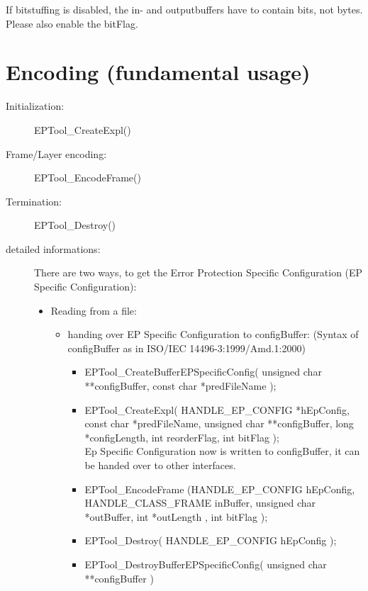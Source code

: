 \documentclass[a4paper]{article}
\begin{document}
If bitstuffing is disabled, the in- and outputbuffers have to contain
bits, not bytes. Please also enable the bitFlag. 

\section{Encoding (fundamental usage)}
\begin{description}
\item[Initialization:] 
 EPTool\_CreateExpl()
\item[Frame/Layer encoding:] EPTool\_EncodeFrame()
\item[Termination:] 
  EPTool\_Destroy()
\item[detailed informations:]
    There are two ways, to get the Error Protection Specific
    Configuration (EP Specific Configuration):
    \begin{itemize}
      \item Reading from a file:
        \begin{itemize}
          \item handing over EP Specific Configuration to configBuffer:
          (Syntax of configBuffer as in ISO/IEC 14496-3:1999/Amd.1:2000)

          \begin{itemize}
          \item EPTool\_CreateBufferEPSpecificConfig( unsigned char
          **configBuffer, const char *predFileName );
          \item EPTool\_CreateExpl( HANDLE\_EP\_CONFIG *hEpConfig,  const char
          *predFileName, unsigned char **configBuffer, long
          *configLength, int reorderFlag, int bitFlag );\\
          Ep Specific Configuration now is written to configBuffer, it
          can be handed over to other interfaces.
          \item EPTool\_EncodeFrame (HANDLE\_EP\_CONFIG hEpConfig,
          HANDLE\_CLASS\_FRAME inBuffer, unsigned char *outBuffer, int
          *outLength , int bitFlag );
          \item EPTool\_Destroy( HANDLE\_EP\_CONFIG hEpConfig );
          \item EPTool\_DestroyBufferEPSpecificConfig( unsigned char
            **configBuffer )
          \end{itemize}
          

\end{itemize}
\end{itemize}
\end{description}
\end{document}
